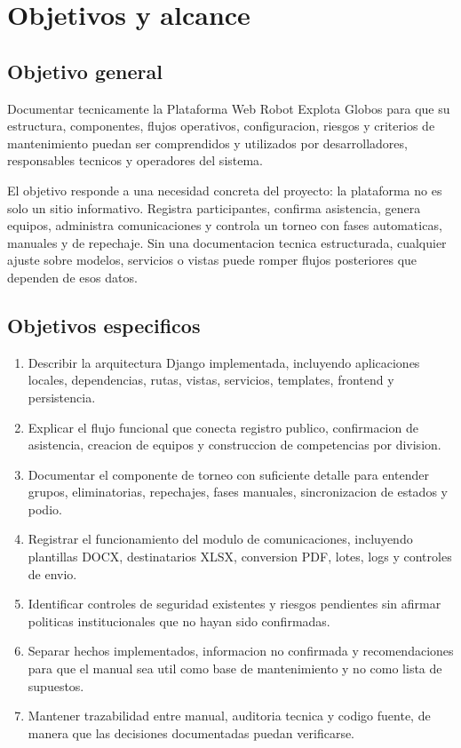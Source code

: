 \chapter{Objetivos y alcance}
\label{chap:objetivos-alcance}

\section{Objetivo general}
\label{sec:objetivo-general}

Documentar tecnicamente la Plataforma Web Robot Explota Globos para que su estructura, componentes, flujos operativos, configuracion, riesgos y criterios de mantenimiento puedan ser comprendidos y utilizados por desarrolladores, responsables tecnicos y operadores del sistema.

El objetivo responde a una necesidad concreta del proyecto: la plataforma no es solo un sitio informativo. Registra participantes, confirma asistencia, genera equipos, administra comunicaciones y controla un torneo con fases automaticas, manuales y de repechaje. Sin una documentacion tecnica estructurada, cualquier ajuste sobre modelos, servicios o vistas puede romper flujos posteriores que dependen de esos datos.

\section{Objetivos especificos}
\label{sec:objetivos-especificos}

\begin{enumerate}
  \item Describir la arquitectura Django implementada, incluyendo aplicaciones locales, dependencias, rutas, vistas, servicios, templates, frontend y persistencia.
  \item Explicar el flujo funcional que conecta registro publico, confirmacion de asistencia, creacion de equipos y construccion de competencias por division.
  \item Documentar el componente de torneo con suficiente detalle para entender grupos, eliminatorias, repechajes, fases manuales, sincronizacion de estados y podio.
  \item Registrar el funcionamiento del modulo de comunicaciones, incluyendo plantillas DOCX, destinatarios XLSX, conversion PDF, lotes, logs y controles de envio.
  \item Identificar controles de seguridad existentes y riesgos pendientes sin afirmar politicas institucionales que no hayan sido confirmadas.
  \item Separar hechos implementados, informacion no confirmada y recomendaciones para que el manual sea util como base de mantenimiento y no como lista de supuestos.
  \item Mantener trazabilidad entre manual, auditoria tecnica y codigo fuente, de manera que las decisiones documentadas puedan verificarse.
\end{enumerate}

